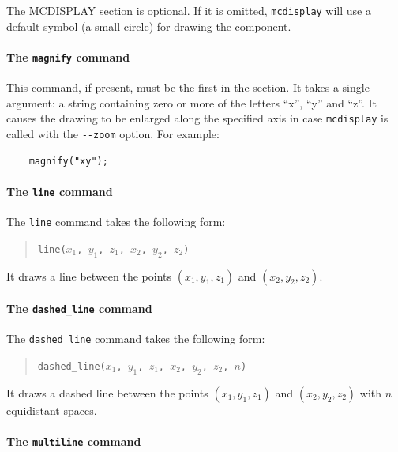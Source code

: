 The MCDISPLAY section is optional. If it is omitted, \verb+mcdisplay+
will use a default symbol (a small circle) for drawing the component.

\paragraph{The {\tt magnify} command}

This command, if present, must be the first in the section. It takes a
single argument: a string containing zero or more of the letters ``x'',
``y'' and ``z''. It causes the drawing to be enlarged along the
specified axis in case \verb+mcdisplay+ is called with the \verb+--zoom+
option. For example:
\begin{verbatim}
    magnify("xy");
\end{verbatim}


\paragraph{The {\tt line} command}

The {\tt line} command takes the following form:
\begin{quote}
  \texttt{line($x_1$, $y_1$, $z_1$, $x_2$, $y_2$, $z_2$)}
\end{quote}
It draws a line between the points $(x_1, y_1, z_1)$ and $(x_2, y_2,
z_2)$.

\paragraph{The {\tt dashed\_line} command}

The {\tt dashed\_line} command takes the following form:
\begin{quote}
  \texttt{dashed\_line($x_1$, $y_1$, $z_1$, $x_2$, $y_2$, $z_2$, $n$)}
\end{quote}
It draws a dashed line between the points $(x_1, y_1, z_1)$ and $(x_2, y_2,
z_2)$ with $n$ equidistant spaces.


\paragraph{The {\tt multiline} command}


